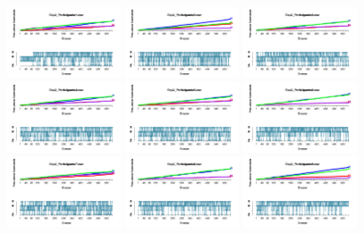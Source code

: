 \begin{figure}[th]
\centering
\includegraphics[width=0.30\textwidth]{Figures/Outcome_Exp2_P1} \includegraphics[width=0.30\textwidth]{Figures/Outcome_Exp2_P2} \includegraphics[width=0.30\textwidth]{Figures/Outcome_Exp2_P3}
\includegraphics[width=0.30\textwidth]{Figures/Outcome_Exp2_P4} \includegraphics[width=0.30\textwidth]{Figures/Outcome_Exp2_P5} \includegraphics[width=0.30\textwidth]{Figures/Outcome_Exp2_P6}
\includegraphics[width=0.30\textwidth]{Figures/Outcome_Exp2_P7} \includegraphics[width=0.30\textwidth]{Figures/Outcome_Exp2_P8} \includegraphics[width=0.30\textwidth]{Figures/Outcome_Exp2_P9}

\end{figure}
